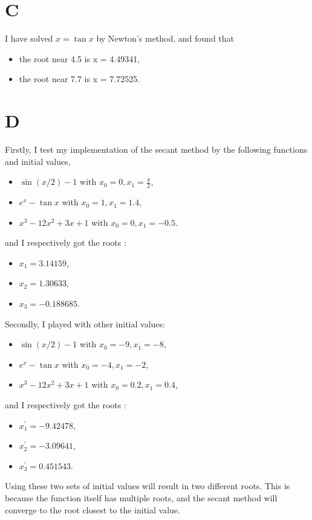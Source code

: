 \documentclass[a4paper]{article}
\begin{document}
\section{C}
I have solved $x = \tan x$ by Newton's method, and found that
\begin{itemize}
  \item the root near 4.5 is x = 4.49341,
  \item the root near 7.7 is x = 7.72525.
\end{itemize}

\section{D}
Firstly, I test my implementation of the secant method by the following functions and initial values,
\begin{itemize}
  \item \(\sin(x/2) - 1\) with \(x_0 = 0, x_1 = \frac{\pi}{2}\),
  \item \(e^x - \tan x\) with \(x_0 = 1, x_1 = 1.4\),
  \item \(x^3 - 12x^2 + 3x + 1\) with \(x_0 = 0, x_1 = -0.5\).
\end{itemize}
and I respectively got the roots :
\begin{itemize}
  \item $x_1 = 3.14159$,
  \item $x_2 = 1.30633$,
  \item $x_3 = -0.188685$.
\end{itemize}

Secondly, I played with other initial values:
\begin{itemize}
  \item \(\sin(x/2) - 1\) with \(x_0 = -9, x_1 = -8\),
  \item \(e^x - \tan x\) with \(x_0 = -4, x_1 = -2\),
  \item \(x^3 - 12x^2 + 3x + 1\) with \(x_0 = 0.2, x_1 = 0.4\),
\end{itemize}
and I respectively got the roots :
\begin{itemize}
  \item $x_{1}^{'} = -9.42478$,
  \item $x_{2}^{'} = -3.09641$,
  \item $x_{3}^{'} = 0.451543$.
\end{itemize}

Using these two sets of initial values will result in two different roots. This is because the function itself has multiple roots, and the secant method will converge to the root closest to the initial value.
\end{document}
